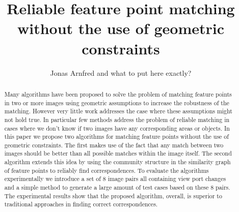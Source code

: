 \documentclass[12pt,journal,compsoc]{IEEEtran}
\begin{document}
\title{Reliable feature point matching without the use of geometric 
constraints}
\author{Jonas Arnfred and what to put here exactly?}

\maketitle
%
\begin{abstract}
Many algorithms have been proposed to solve the problem of matching 
feature points in two or more images using geometric assumptions to 
increase the robustness of the matching. However very little work 
addresses the case where these assumptions might not hold true. In 
particular few methods address the problem of reliable matching in cases 
where we don't know if two images have any corresponding areas or 
objects. In this paper we propose two algorithms for matching feature 
points without the use of geometric constraints. The first makes use of 
the fact that any match between two images should be better than all 
possible matches within the image itself. The second algorithm extends 
this idea by using the community structure in the similarity graph of 
feature points to reliably find correspondences. To evaluate the 
algorithms experimentally we introduce a set of 8 image pairs all 
containing view port changes and a simple method to generate a large 
amount of test cases based on these 8 pairs. The experimental results 
show that the proposed algorithm, overall, is superior to traditional 
approaches in finding correct correspondences.
\end{abstract}
%
\end{document}
